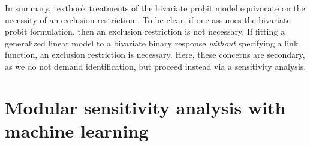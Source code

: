 \documentclass[aoas,preprint, 11pt, dvipsnames, table, x11name]{imsart}
\theoremstyle{remark}
\begin{document}
	In summary, textbook treatments of the bivariate probit model equivocate on the necessity of an exclusion restriction \citep[Chapter~15]{Wooldridge-2010}.  To be clear, if one assumes the bivariate probit formulation, then an exclusion restriction is not necessary.  If fitting a generalized linear model to a bivariate binary response {\em without} specifying a link function, an exclusion restriction is necessary. Here, these concerns are secondary, as we do not demand identification, but proceed instead via a sensitivity analysis.
	
	\section{Modular sensitivity analysis with machine learning}\label{section_indirect_inference}
	
\end{document}
